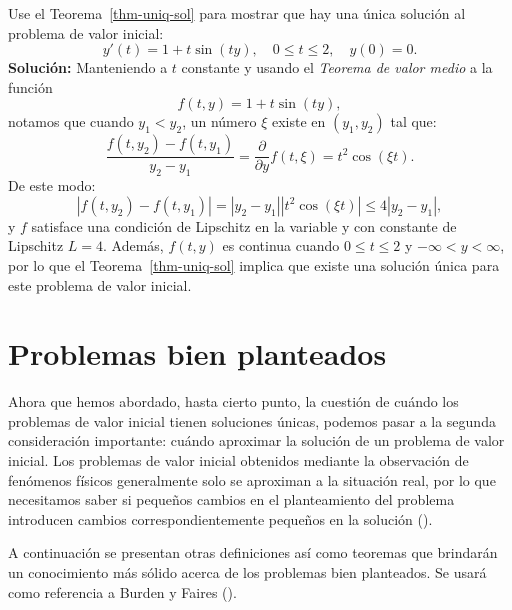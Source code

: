 \documentclass[
  spanish,
  us-letterpaper,
  DIV=11,
  numbers=noendperiod]{scrreprt}
\theoremstyle{plain}
\theoremstyle{definition}
\theoremstyle{remark}
\begin{document}
\begin{tcolorbox}[enhanced jigsaw, leftrule=.75mm, opacityback=0, arc=.35mm, toptitle=1mm, colframe=quarto-callout-caution-color-frame, colbacktitle=quarto-callout-caution-color!10!white, left=2mm, colback=white, opacitybacktitle=0.6, bottomtitle=1mm, titlerule=0mm, title={Ejemplo}, coltitle=black, bottomrule=.15mm, toprule=.15mm, breakable, rightrule=.15mm]

Use el Teorema~\ref{thm-uniq-sol} para mostrar que hay una única
solución al problema de valor inicial: \[
y'(t)= 1 + t\sin(ty), \quad 0\leq t \leq 2, \quad y(0) = 0.
\] \textbf{Solución:} Manteniendo a \(t\) constante y usando el
\emph{Teorema de valor medio} a la función \[
f(t,y) = 1 + t\sin(ty),
\] notamos que cuando \(y_1<y_2\), un número \(\xi\) existe en
\((y_1,y_2)\) tal que: \[
\dfrac{f(t,y_2)-f(t,y_1)}{y_2-y_1} = \dfrac{\partial}{\partial y} f(t,\xi) = t^2\cos(\xi t).
\] De este modo: \[
|f(t,y_2)-f(t,y_1)| = |y_2-y_1||t^2\cos(\xi t)| \leq 4|y_2-y_1|,
\] y \(f\) satisface una condición de Lipschitz en la variable y con
constante de Lipschitz \(L = 4\). Además, \(f(t, y)\) es continua cuando
\(0 ≤ t ≤ 2\) y \(−∞ < y < ∞\), por lo que el Teorema~\ref{thm-uniq-sol}
implica que existe una solución única para este problema de valor
inicial.

\end{tcolorbox}

\section{Problemas bien planteados}\label{problemas-bien-planteados}

Ahora que hemos abordado, hasta cierto punto, la cuestión de cuándo los
problemas de valor inicial tienen soluciones únicas, podemos pasar a la
segunda consideración importante: cuándo aproximar la solución de un
problema de valor inicial. Los problemas de valor inicial obtenidos
mediante la observación de fenómenos físicos generalmente solo se
aproximan a la situación real, por lo que necesitamos saber si pequeños
cambios en el planteamiento del problema introducen cambios
correspondientemente pequeños en la solución
().

A continuación se presentan otras definiciones así como teoremas que
brindarán un conocimiento más sólido acerca de los problemas bien
planteados. Se usará como referencia a Burden y Faires
().
\end{document}
